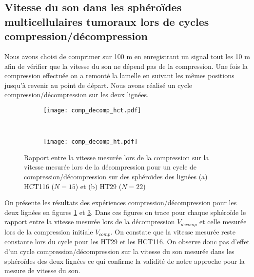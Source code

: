 \subsection{Vitesse du son dans les sphéroïdes multicellulaires tumoraux lors de cycles compression/décompression}
\label{velocity_comp_decomp}
Nous avons choisi de comprimer sur 100 \textmu m en enregistrant un signal tout les 10 \textmu m afin de vérifier que la vitesse du son ne dépend pas de la compression. Une fois la compression effectuée on a remonté la lamelle en suivant les mêmes positions jusqu'à revenir au point de départ. Nous avons réalisé un cycle compression/décompression sur les deux lignées.
\begin{figure}[tb!]

	\begin{subfigure}[t]{0.49\textwidth}
	\texttt{[image: comp\_decomp\_hct.pdf]}
	\caption{\label{compression_decompression_hct}}
	\end{subfigure}
	~~
		\begin{subfigure}[t]{0.49\textwidth}
	\texttt{[image: comp\_decomp\_ht.pdf]}
	\caption{\label{compression_decompression_ht}}
	\end{subfigure}
	\caption{ Rapport  entre la vitesse mesurée lors de la compression sur la vitesse mesurée lors de la décompression pour un cycle de compression/décompression  sur des sphéroïdes des lignées (a) HCT116  ($N=15$)  et (b) HT29  ($N=22$) }
\end{figure}
On présente les résultats des expériences compression/décompression pour les deux lignées en figures \ref{compression_decompression_hct} et \ref{compression_decompression_ht}. Dans ces figures on trace pour chaque sphéroïde le rapport entre la vitesse mesurée lors de la décompression $V_{decomp}$ et celle mesurée lors de la compression initiale $V_{comp}$. On constate que la vitesse mesurée reste constante lors du cycle pour les HT29 et les HCT116. On observe donc pas d'effet d'un cycle compression/décompression sur la vitesse du son mesurée dans les sphéroïdes des deux lignées ce qui confirme la validité de notre approche pour la mesure de vitesse du son.

